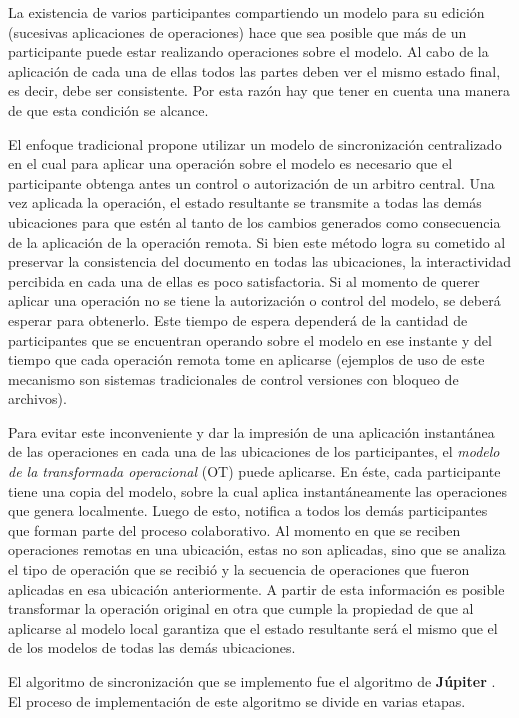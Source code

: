 \documentclass[12pt,a4paper]{article}
\begin{document}
	La existencia de varios participantes compartiendo un modelo para su edición (sucesivas aplicaciones de
	operaciones) hace que sea posible que más de un participante puede estar realizando operaciones sobre el modelo.
	Al cabo de la aplicación de cada una de ellas todos las partes deben ver el mismo estado final, es decir,
	debe ser consistente. Por esta razón hay que tener en cuenta una manera de que esta condición se alcance.

	El enfoque tradicional propone utilizar un modelo de sincronización centralizado en el cual para aplicar una
	operación sobre el modelo es necesario que el participante obtenga antes un control o autorización de un
	arbitro central. Una vez aplicada la operación, el estado resultante se transmite a todas las demás ubicaciones
	para que estén al tanto de los cambios generados como consecuencia de la aplicación de la operación remota.
	Si bien este método logra su cometido al preservar la consistencia del documento en todas las ubicaciones, la
	interactividad percibida en cada una de ellas es poco satisfactoria. Si al momento de querer aplicar una 
	operación no se tiene la autorización o control del modelo, se deberá esperar para obtenerlo. 
	Este tiempo de espera dependerá de la cantidad de participantes que se encuentran operando sobre el modelo
	en ese instante y del tiempo que cada operación remota tome en aplicarse (ejemplos de uso de este mecanismo
	son sistemas tradicionales de control versiones con bloqueo de archivos).

	Para evitar este inconveniente y dar la impresión de una aplicación instantánea de las operaciones en cada
	una de las ubicaciones de los participantes, el \textit{modelo de la transformada operacional} (OT)
	\cite{operationaltransform} puede aplicarse. En éste, cada participante tiene una copia del modelo, sobre la
	cual aplica instantáneamente las operaciones que genera localmente. Luego de esto, notifica a todos los demás
	participantes que forman parte del proceso colaborativo.
	Al momento en que se reciben operaciones remotas en una ubicación, estas no son aplicadas, sino que se analiza
	el tipo de operación que se recibió y la secuencia de operaciones que fueron aplicadas en esa ubicación
	anteriormente. A partir de esta información es posible transformar la operación original en otra que cumple
	la propiedad de que al aplicarse al modelo local garantiza que el estado resultante será el mismo que el de
	los modelos de todas las demás ubicaciones.

	El algoritmo de sincronización que se implemento fue el algoritmo de \textbf{Júpiter} \cite{jupiter}. 
	El proceso de implementación de este algoritmo se divide en varias etapas.
	
\end{document}
